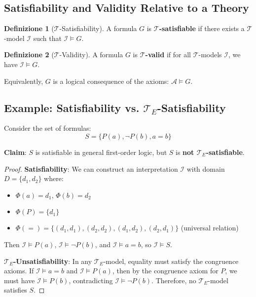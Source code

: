 \documentclass[11pt,a4paper]{article}
\theoremstyle{definition}
\newtheorem{definition}{Definizione}[section]
\theoremstyle{plain}
\theoremstyle{remark}
\begin{document}
\subsection{Satisfiability and Validity Relative to a Theory}

\begin{definition}[$\mathcal{T}$-Satisfiability]
A formula $G$ is \textbf{$\mathcal{T}$-satisfiable} if there exists a $\mathcal{T}$-model $\mathcal{I}$ such that $\mathcal{I} \models G$.
\end{definition}

\begin{definition}[$\mathcal{T}$-Validity]
A formula $G$ is \textbf{$\mathcal{T}$-valid} if for all $\mathcal{T}$-models $\mathcal{I}$, we have $\mathcal{I} \models G$.

Equivalently, $G$ is a logical consequence of the axioms: $\mathcal{A} \models G$.
\end{definition}

\subsection{Example: Satisfiability vs. $\mathcal{T}_E$-Satisfiability}

Consider the set of formulas:
\[
S = \{ P(a), \neg P(b), a = b \}
\]

\textbf{Claim}: $S$ is satisfiable in general first-order logic, but $S$ is \textbf{not $\mathcal{T}_E$-satisfiable}.

\begin{proof}
\textbf{Satisfiability}: We can construct an interpretation $\mathcal{I}$ with domain $D = \{d_1, d_2\}$ where:
\begin{itemize}
    \item $\Phi(a) = d_1$, $\Phi(b) = d_2$
    \item $\Phi(P) = \{d_1\}$
    \item $\Phi(=) = \{(d_1, d_1), (d_2, d_2), (d_1, d_2), (d_2, d_1)\}$ (universal relation)
\end{itemize}
Then $\mathcal{I} \models P(a)$, $\mathcal{I} \models \neg P(b)$, and $\mathcal{I} \models a = b$, so $\mathcal{I} \models S$.

\textbf{$\mathcal{T}_E$-Unsatisfiability}: In any $\mathcal{T}_E$-model, equality must satisfy the congruence axioms. If $\mathcal{I} \models a = b$ and $\mathcal{I} \models P(a)$, then by the congruence axiom for $P$, we must have $\mathcal{I} \models P(b)$, contradicting $\mathcal{I} \models \neg P(b)$. Therefore, no $\mathcal{T}_E$-model satisfies $S$.
\end{proof}
\end{document}
